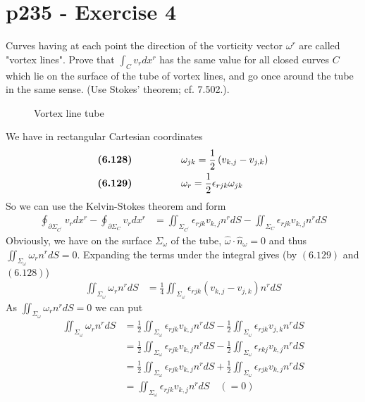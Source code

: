 \section{p235 - Exercise 4}
\begin{tcolorbox}
Curves having at each point the direction of the vorticity vector $\omega^r$ are called "vortex lines". Prove that $\int_{C} v_rdx^r$ has the same value for all closed curves $C$ which lie on the surface of the tube of vortex lines, and go once around the tube in the same sense. (Use Stokes' theorem; cf. 7.502.).
\end{tcolorbox}
\begin{figure}[H]%
    \centering

\caption{Vortex line tube }
\label{fig:fig_p2235}
\end{figure}
We have in rectangular Cartesian coordinates
\begin{align}
\textbf{(6.128)}\quad\quad\quad\quad\quad &\omega_{jk}=\frac{1}{2}\left(v_{k,j}-v_{j,k}\right)\\
\textbf{(6.129)}\quad\quad\quad\quad\quad &\omega_r=\frac{1}{2}\epsilon_{rjk}\omega_{jk}
\end{align}
So we can use the Kelvin-Stokes theorem and form
\begin{align}
\oint_{\partial\Sigma_{C^{'}}} {v_rdx^r }-\oint_{\partial\Sigma_{C}} v_rdx^r&= \iint_{\Sigma_{C^{'}}}\epsilon_{rjk}v_{k,j}n^rdS-\iint_{\Sigma_{C}}\epsilon_{rjk}v_{k,j}n^rdS
\end{align}
Obviously, we have on the surface $\Sigma_{\omega}$ of the tube,  $\hat{\omega}\cdot\hat{n}_{\omega}=0$ and thus $\iint_{\Sigma_{\omega}}\omega_rn^rdS=0$.
Expanding the terms under the integral gives (by $(6.129)$ and $(6.128)$)
\begin{align}
\iint_{\Sigma_{\omega}}\omega_rn^rdS&=\frac{1}{4}\iint_{\Sigma_{\omega}}\epsilon_{rjk}\left(v_{k,j}-v_{j,k}\right)n^rdS
\end{align}
As $\iint_{\Sigma_{\omega}}\omega_rn^rdS=0$ we can put 
\begin{align}
\iint_{\Sigma_{\omega}}\omega_rn^rdS&=\frac{1}{2}\iint_{\Sigma_{\omega}}\epsilon_{rjk}v_{k,j}n^rdS-\frac{1}{2}\iint_{\Sigma_{\omega}}\epsilon_{rjk}v_{j,k}n^rdS\\
&=\frac{1}{2}\iint_{\Sigma_{\omega}}\epsilon_{rjk}v_{k,j}n^rdS-\frac{1}{2}\iint_{\Sigma_{\omega}}\epsilon_{rkj}v_{k,j}n^rdS\\
&=\frac{1}{2}\iint_{\Sigma_{\omega}}\epsilon_{rjk}v_{k,j}n^rdS+\frac{1}{2}\iint_{\Sigma_{\omega}}\epsilon_{rjk}v_{k,j}n^rdS\\
&=\iint_{\Sigma_{\omega}}\epsilon_{rjk}v_{k,j}n^rdS\quad\left(=0\right)
\end{align}

